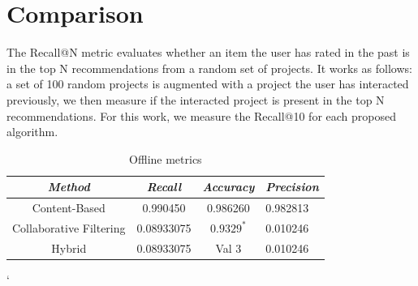 \documentclass[cic,tc,english]{iiufrgs}
\begin{document}
\section{Comparison}
The Recall@N metric evaluates whether an item the user has rated in the past is in the top N recommendations from a random set of projects. It works as follows: a set of 100 random projects is augmented with a project the user has interacted previously, we then measure if the interacted project is present in the top N recommendations. For this work, we measure the Recall@10 for each proposed algorithm.
\begin{table}[h]
    \caption{Offline metrics}
    \centering
        \begin{tabular}{c|c|c|p{5cm}}
          \hline
          \textit{Method}  &   \textit{Recall}  &   \textit{Accuracy}  &   \textit{Precision} \\
          \hline
          \hline
          Content-Based           &   0.990450           & 0.986260 &  0.982813 \\
          Collaborative Filtering     & 0.08933075             & $0.9329^*$  & 0.010246\\
          Hybrid     & 0.08933075             & Val 3  & 0.010246\\
          \hline
        \end{tabular}`
    \label{tbl:offline_metrics}
\end{table}
\end{document}
